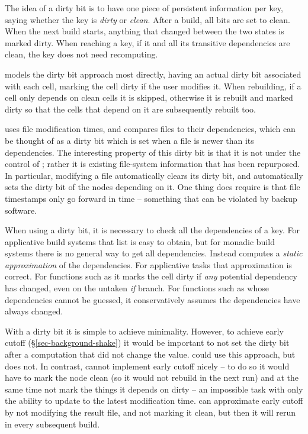 The idea of a dirty bit is to have one piece of persistent
information per key, saying whether the key is
\emph{dirty} or \emph{clean}. After a build, all bits are set to clean. When the
next build starts, anything that changed between the two states is marked
dirty.
When reaching a key, if it and all its transitive dependencies are clean, the
key does not need recomputing.

\Excel models the dirty bit approach most directly, having an actual dirty bit
associated with each cell, marking the cell dirty if the user modifies it.
When rebuilding, if a cell only depends on clean cells it is skipped, otherwise
it is rebuilt and marked dirty so that the cells that depend on it are
subsequently rebuilt too.


\Make uses file modification times, and compares files to their
dependencies, which can be thought of as a dirty bit which is set when
a file is newer than its dependencies. The interesting property of
this dirty bit is that it is not under the control of \Make; rather it is
existing file-system information that has been repurposed. In particular,
modifying a file automatically clears its dirty bit, and
automatically sets the dirty bit of the nodes depending on it. One
thing \Make does require is that file timestamps only go forward in
time -- something that can be violated by backup software.

When using a dirty bit, it is necessary to check all the dependencies of a key.
For applicative build systems that list is easy to obtain, but for monadic
build systems there is no general way to get all dependencies. Instead \Excel
computes a \emph{static approximation} of the dependencies. For applicative
tasks that approximation is correct. For functions such as  it marks the
cell dirty if \emph{any} potential dependency has changed, even on the untaken
\emph{if} branch. For functions such as  whose dependencies cannot
be guessed, it conservatively assumes the dependencies have always changed.

With a dirty bit it is simple to achieve minimality. However, to achieve early cutoff
(\S\ref{sec-background-shake}) it would be important to not set the dirty bit
after a computation that did not change the value. \Excel could use this
approach, but does not. In contrast, \Make cannot implement early cutoff nicely -- to
do so it would have to mark the node clean (so it would not rebuild in the next
run) and at the same time not mark the things it depends on dirty -- an
impossible task with only the ability to update to the latest modification time.
\Make can approximate early cutoff by not modifying the result file, and not marking it clean,
but then it will rerun in every subsequent build.

